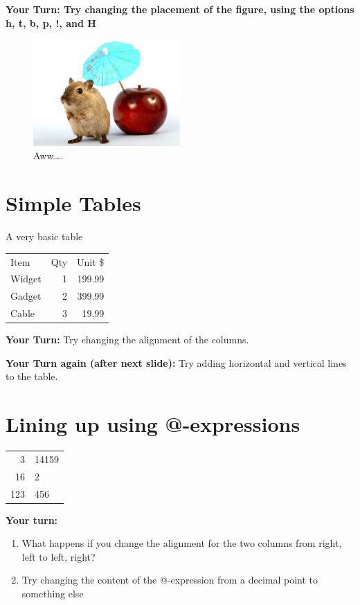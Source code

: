 \documentclass{article}
\begin{document}
{\bf Your Turn: Try changing the placement of the figure, using the options h, t, b, p, !, and H}
\begin{figure}[h]
\centering
\includegraphics[width=0.5\textwidth]{gerbil}
\caption{\label{fig:gerbil2}Aww\ldots.}
\end{figure}
\clearpage

\section{Simple Tables}

A very basic table
\bigskip

\begin{tabular}{lrr}
Item   & Qty & Unit \$ \\
Widget & 1   & 199.99  \\
Gadget & 2   & 399.99  \\
Cable  & 3   & 19.99   \\
\end{tabular}
\bigskip

{\bf Your Turn:}
Try changing the alignment of the columns.

{\bf Your Turn again (after next slide):}
Try adding horizontal and vertical lines to the table.

\clearpage
\section{Lining up using @-expressions}

\begin{tabular}{r@{.}l} \hline
  3   & 14159 \\
  16  & 2     \\
  123 & 456   \\  \hline
\end{tabular}
\bigskip

{\bf Your turn:}
\begin{enumerate}
\item What happens if you change the alignment for the two columns from right, left to left, right? 
\item Try changing the content of the @-expression from a decimal point to something else
\end{enumerate}
\clearpage
\end{document}
